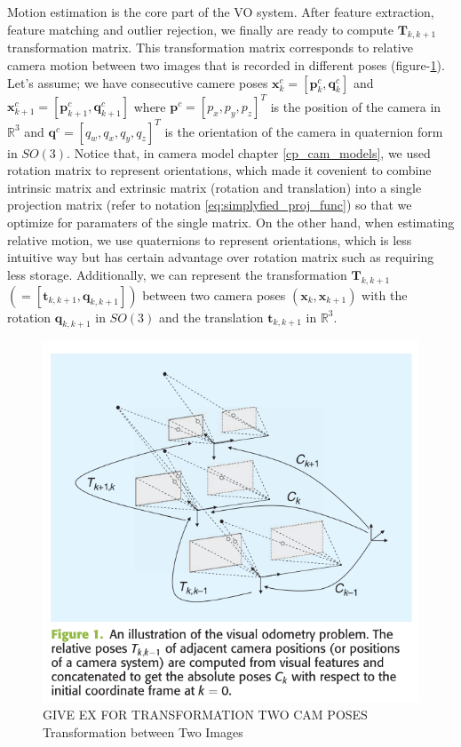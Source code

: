 \documentclass[a4paper]{report}
\numberwithin{figure}{section}
\newcommand{\R}{\mathbb{R}}
\begin{document}
Motion estimation is the core part of the VO system. After 
feature extraction, feature matching and outlier rejection,
we finally are ready to compute $\mathbf{T}_{k, k+1}$ transformation matrix. 
This transformation matrix corresponds to relative camera motion between 
two images that is recorded in different poses (figure-\ref{fig:transformation_ij}).
Let's assume; we have 
consecutive camere poses $\mathbf{x}_k^c = [\mathbf{p}_k^c, \mathbf{q}_k^c]$ and 
$\mathbf{x}_{k+1}^c = [\mathbf{p}_{k+1}^c, \mathbf{q}_{k+1}^c]$ where 
$\mathbf{p}^c = [p_x, p_y, p_z]^T$ is the position of the camera in $\R^3$
and $\mathbf{q}^c = [q_w, q_x, q_y, q_z]^T$ is 
the orientation of the camera in quaternion form in $SO(3)$. 
Notice that, in camera model chapter 
\ref{cp_cam_models}, we used rotation matrix to represent orientations, 
which made it covenient to combine intrinsic matrix and extrinsic matrix 
(rotation and translation) into a single projection matrix 
(refer to notation \ref{eq:simplyfied_proj_func})
so that 
we optimize for paramaters of the single matrix. On the other hand, when 
estimating relative motion, we use quaternions to represent orientations, 
which is less intuitive way but 
has certain advantage over rotation matrix such as requiring less storage.
Additionally, we can represent the transformation 
$\mathbf{T}_{k,k+1}$ $(= [\mathbf{t}_{k,k+1},\mathbf{q}_{k,k+1}])$ between two camera poses 
$(\mathbf{x}_k,\mathbf{x}_{k+1})$ with the rotation $\mathbf{q}_{k,k+1}$ in $SO(3)$  
and the translation $\mathbf{t}_{k,k+1}$ in $\R^3$.

\begin{figure}[H]
	\centering
  \includegraphics[width=0.7\linewidth,natwidth=640,natheight=640]
  {fig/ref_imgs/transformation_ij.png}
  \caption{GIVE EX FOR TRANSFORMATION TWO CAM POSES Transformation between Two Images}
	\label{fig:transformation_ij}
\end{figure}
\end{document}

